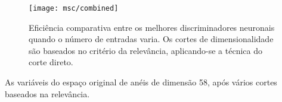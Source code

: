 \begin{figure}
\begin{center}
\texttt{[image: msc/combined]}
\end{center}
\caption[Eficiência comparativa entre os melhores discriminadores neuronais
quando o número de entradas varia.]{Eficiência comparativa entre os melhores
discriminadores neuronais quando o número de entradas varia. Os cortes de
dimensionalidade são baseados no critério da relevância, aplicando-se a técnica
do corte direto.}
\label{fig:last-effic}
\end{figure}

\begin{table}
\caption{As variáveis do espaço original de anéis de dimensão 58, após vários
cortes baseados na relevância.} 
\label{tab:left-direct}
\renewcommand{\baselinestretch}{1}
\begin{center}
\small

\normalsize
\renewcommand{\baselinestretch}{1.5}
\end{center}
\end{table}

